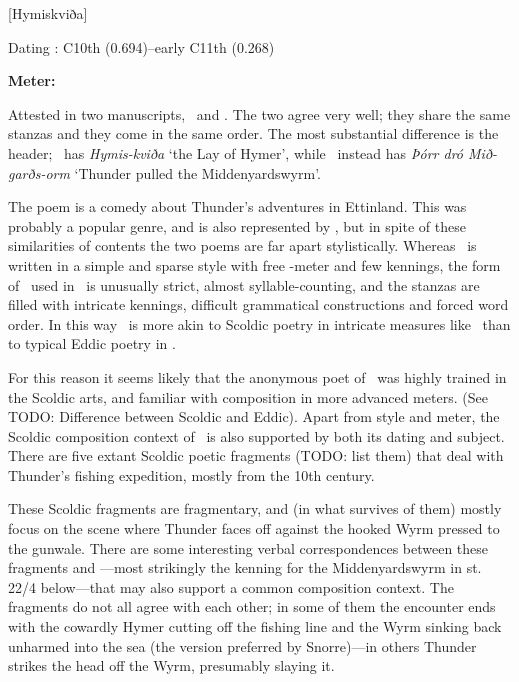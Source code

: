[Hymiskviða]

\begin{flushright}%
Dating \parencite{Sapp2022}: C10th (0.694)–early C11th (0.268)

\textbf{Meter: }\Fornyrdislag%
\end{flushright}%

Attested in two manuscripts, \Regius\ and \AM.  The two agree very well; they share the same stanzas and they come in the same order.  The most substantial difference is the header; \AM\ has \emph{Hymis-kviða} ‘the Lay of Hymer’, while \Regius\ instead has \emph{Þórr dró Mið-garðs-orm} ‘Thunder pulled the Middenyardswyrm’.

The poem is a comedy about Thunder’s adventures in Ettinland.  This was probably a popular genre, and is also represented by \Thrymskvida, but in spite of these similarities of contents the two poems are far apart stylistically.  Whereas \Thrymskvida\ is written in a simple and sparse style with free \Fornyrdislag-meter and few kennings, the form of \Fornyrdislag\ used in \Hymiskvida\ is unusually strict, almost syllable-counting, and the stanzas are filled with intricate kennings, difficult grammatical constructions and forced word order.  In this way \Hymiskvida\ is more akin to Scoldic poetry in intricate measures like \Drottkvett\ than to typical Eddic poetry in \Fornyrdislag.

For this reason it seems likely that the anonymous poet of \Hymiskvida\ was highly trained in the Scoldic arts, and familiar with composition in more advanced meters.  (See TODO: Difference between Scoldic and Eddic).  Apart from style and meter, the Scoldic composition context of \Hymiskvida\ is also supported by both its dating and subject.  There are five extant Scoldic poetic fragments (TODO: list them) that deal with Thunder’s fishing expedition, mostly from the 10th century.

These Scoldic fragments are fragmentary, and (in what survives of them) mostly focus on the scene where Thunder faces off against the hooked Wyrm pressed to the gunwale.  There are some interesting verbal correspondences between these fragments and \Hymiskvida—most strikingly the kenning for the Middenyardswyrm in st. 22/4 below—that may also support a common composition context.  The fragments do not all agree with each other; in some of them the encounter ends with the cowardly Hymer cutting off the fishing line and the Wyrm sinking back unharmed into the sea (the version preferred by Snorre)—in others Thunder strikes the head off the Wyrm, presumably slaying it.

